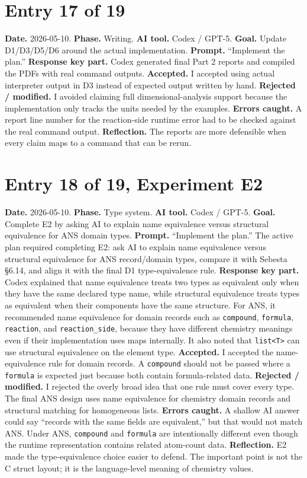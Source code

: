 \documentclass[11pt,a4paper]{article}
\newcommand{\code}[1]{\texttt{#1}}
\begin{document}
\section*{Entry 17 of 19}
\textbf{Date.} 2026-05-10.
\textbf{Phase.} Writing.
\textbf{AI tool.} Codex / GPT-5.
\textbf{Goal.} Update D1/D3/D5/D6 around the actual implementation.
\textbf{Prompt.} ``Implement the plan.''
\textbf{Response key part.} Codex generated final Part 2 reports and compiled the PDFs with real command outputs.
\textbf{Accepted.} I accepted using actual interpreter output in D3 instead of expected output written by hand.
\textbf{Rejected / modified.} I avoided claiming full dimensional-analysis support because the implementation only tracks the units needed by the examples.
\textbf{Errors caught.} A report line number for the reaction-side runtime error had to be checked against the real command output.
\textbf{Reflection.} The reports are more defensible when every claim maps to a command that can be rerun.

\section*{Entry 18 of 19, Experiment E2}
\textbf{Date.} 2026-05-10.
\textbf{Phase.} Type system.
\textbf{AI tool.} Codex / GPT-5.
\textbf{Goal.} Complete E2 by asking AI to explain name equivalence versus structural equivalence for ANS domain types.
\textbf{Prompt.} ``Implement the plan.'' The active plan required completing E2: ask AI to explain name equivalence versus structural equivalence for ANS record/domain types, compare it with Sebesta \S6.14, and align it with the final D1 type-equivalence rule.
\textbf{Response key part.} Codex explained that name equivalence treats two types as equivalent only when they have the same declared type name, while structural equivalence treats types as equivalent when their components have the same structure. For ANS, it recommended name equivalence for domain records such as \code{compound}, \code{formula}, \code{reaction}, and \code{reaction\_side}, because they have different chemistry meanings even if their implementation uses maps internally. It also noted that \code{list<T>} can use structural equivalence on the element type.
\textbf{Accepted.} I accepted the name-equivalence rule for domain records. A \code{compound} should not be passed where a \code{formula} is expected just because both contain formula-related data.
\textbf{Rejected / modified.} I rejected the overly broad idea that one rule must cover every type. The final ANS design uses name equivalence for chemistry domain records and structural matching for homogeneous lists.
\textbf{Errors caught.} A shallow AI answer could say ``records with the same fields are equivalent,'' but that would not match ANS. Under ANS, \code{compound} and \code{formula} are intentionally different even though the runtime representation contains related atom-count data.
\textbf{Reflection.} E2 made the type-equivalence choice easier to defend. The important point is not the C struct layout; it is the language-level meaning of chemistry values.
\end{document}
